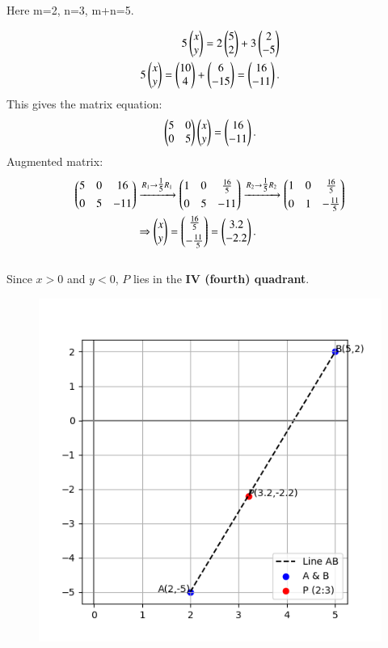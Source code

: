 \documentclass[journal]{article}
\begin{document}
Here  m=2, n=3, m+n=5. 

\begin{align}
5\begin{pmatrix}x\\y\end{pmatrix} = 2\begin{pmatrix}5\\2\end{pmatrix} + 3\begin{pmatrix}2\\-5\end{pmatrix} \\
5\begin{pmatrix}x\\y\end{pmatrix}= \begin{pmatrix}10\\4\end{pmatrix} + \begin{pmatrix}6\\-15\end{pmatrix} = \begin{pmatrix}16\\-11\end{pmatrix}.
\end{align}
This gives the matrix equation:
\begin{align}
\begin{pmatrix}5 & 0 \\ 0 & 5\end{pmatrix}\begin{pmatrix}x\\y\end{pmatrix} = \begin{pmatrix}16\\-11\end{pmatrix}. 
\end{align}
Augmented matrix:\\ [4pt]
\begin{align}
\begin{pmatrix}
5 & 0 & 16 \\[4pt]
0 & 5 & -11\end{pmatrix}
&\xrightarrow{R_1 \rightarrow \tfrac{1}{5}R_1}
\begin{pmatrix}
1 & 0 & \tfrac{16}{5} \\[4pt]
0 & 5 & -11\end{pmatrix}
\xrightarrow{R_2 \rightarrow \tfrac{1}{5}R_2}
\begin{pmatrix}
1 & 0 & \tfrac{16}{5} \\[4pt]
0 & 1 & -\tfrac{11}{5}\end{pmatrix}\\
&\Rightarrow \begin{pmatrix}x\\y\end{pmatrix} = \begin{pmatrix}\tfrac{16}{5}\\[4pt]-\tfrac{11}{5}\end{pmatrix} = \begin{pmatrix}3.2\\-2.2\end{pmatrix}.
\end{align}\\
Since \(x>0\) and \(y<0\), \(P\) lies in the \textbf{IV (fourth) quadrant}.
\newpage
\begin{figure}
    \centering
    \includegraphics[width=0.9\linewidth]{figs/fig_1.png}
    \caption{}
    \label{fig:placeholder}
\end{figure}
\end{document}
